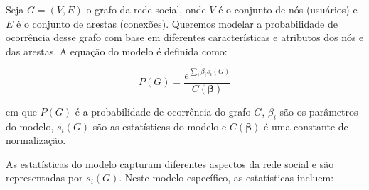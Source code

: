 Seja $G = (V, E)$ o grafo da rede social, onde $V$ é o conjunto de nós (usuários) e $E$ é o conjunto de arestas (conexões). Queremos modelar a probabilidade de ocorrência desse grafo com base em diferentes características e atributos dos nós e das arestas. A equação do modelo é definida como:

\[
	P(G) = \frac{e^{\sum_i \beta_i s_i(G)}}{C(\boldsymbol{\beta})}
\]

em que $P(G)$ é a probabilidade de ocorrência do grafo $G$, $\beta_i$ são os parâmetros do modelo, $s_i(G)$ são as estatísticas do modelo e $C(\boldsymbol{\beta})$ é uma constante de normalização.

As estatísticas do modelo capturam diferentes aspectos da rede social e são representadas por $s_i(G)$. Neste modelo específico, as estatísticas incluem:

